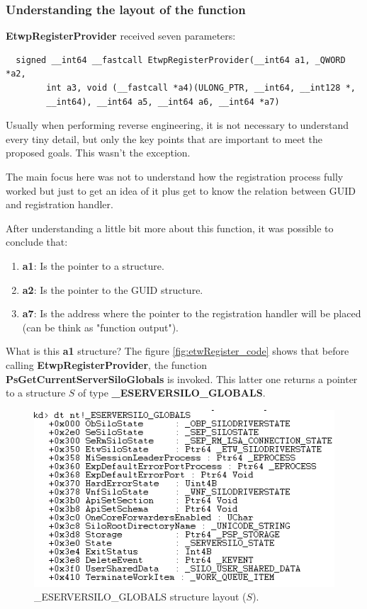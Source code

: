 
  \subsubsection{Understanding the layout of the function}
  {\bfseries EtwpRegisterProvider} received seven parameters:
  \begin{verbatim}
  signed __int64 __fastcall EtwpRegisterProvider(__int64 a1, _QWORD *a2,
        int a3, void (__fastcall *a4)(ULONG_PTR, __int64, __int128 *,
        __int64), __int64 a5, __int64 a6, __int64 *a7)
  \end{verbatim}

  Usually when performing reverse engineering, it is not necessary to understand every tiny detail, but only the key points that are important to meet the proposed goals. This wasn't the exception. 

  The main focus here was not to understand how the registration process fully worked but just to get an idea of it plus get to know the relation between GUID and registration handler.

  After understanding a little bit more about this function, it was possible to conclude that:
  \begin{enumerate}
  \item {\bfseries a1}: Is the pointer to a structure.
  \item {\bfseries a2}: Is the pointer to the GUID structure. 
  \item {\bfseries a7}: Is the address where the pointer to the registration handler will be placed (can be think as "function output").
  \end{enumerate}

  What is this {\bfseries a1} structure?
  The figure \ref{fig:etwRegister_code} shows that before calling {\bfseries EtwpRegisterProvider}, the function {\bfseries PsGetCurrentServerSiloGlobals} is invoked. This latter one returns a pointer to a structure $S$ of type {\bfseries \_ESERVERSILO\_GLOBALS}. 

  \begin{centering}
  \begin{figure}[H]
    \includegraphics[width=12cm]{images/ESILOGLOBALS_structure.png}
    \caption[]{\_ESERVERSILO\_GLOBALS structure layout ($S$).}
    \label{fig:eserversilo_globals_structure}
  \end{figure}
  \end{centering}

